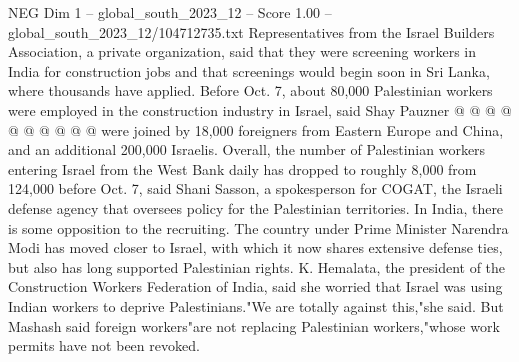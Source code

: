 \begin{textsample}{NEG Dim 1 – global\_south\_2023\_12 – Score 1.00 – global\_south\_2023\_12/104712735.txt}
Representatives from the Israel Builders Association, a private organization, said that they were screening workers in India for construction jobs and that screenings would begin soon in Sri Lanka, where thousands have applied.
Before Oct. 7, about 80,000 Palestinian workers were employed in the construction industry in Israel, said Shay Pauzner @ @ @ @ @ @ @ @ @ @ were joined by 18,000 foreigners from Eastern Europe and China, and an additional 200,000 Israelis.
Overall, the number of Palestinian workers entering Israel from the West Bank daily has dropped to roughly 8,000 from 124,000 before Oct. 7, said Shani Sasson, a spokesperson for COGAT, the Israeli defense agency that oversees policy for the Palestinian territories.
In India, there is some opposition to the recruiting.
The country under Prime Minister Narendra Modi has moved closer to Israel, with which it now shares extensive defense ties, but also has long supported Palestinian rights.
K.
Hemalata, the president of the Construction Workers Federation of India, said she worried that Israel was using Indian workers to deprive Palestinians."We are totally against this,"she said.
But Mashash said foreign workers"are not replacing Palestinian workers,"whose work permits have not been revoked.

\end{textsample}
